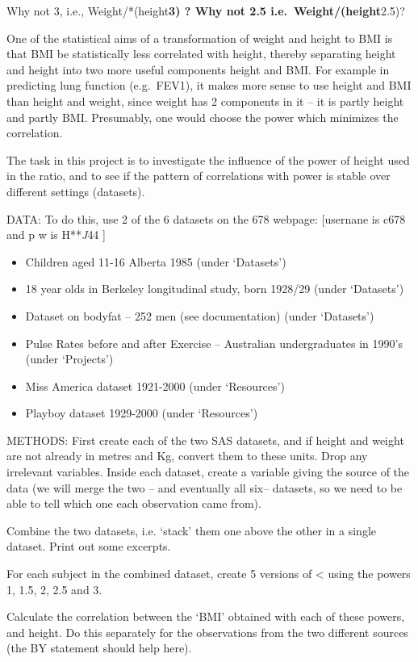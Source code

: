 \documentclass[]{book}
\providecommand{\tightlist}{%
  \setlength{\itemsep}{0pt}\setlength{\parskip}{0pt}}
\begin{document}
Why not 3, i.e., Weight/*(height\textbf{3) ? Why not 2.5 i.e.~Weight/(height}2.5)?

One of the statistical aims of a transformation of weight and height to BMI is that BMI be statistically less correlated with height, thereby separating height and height into two more useful components height and BMI. For example in predicting lung function (e.g.~FEV1), it makes more sense to use height and BMI than height and weight, since weight has 2 components in it -- it is partly height and partly BMI. Presumably, one would choose the power which minimizes the correlation.

The task in this project is to investigate the influence of the power of height used in the ratio, and to see if the pattern of correlations with power is stable over different settings (datasets).

DATA: To do this, use 2 of the 6 datasets on the 678 webpage:
{[}usernane is c678 and p w is H**\emph{J}44 {]}

\begin{itemize}
\tightlist
\item
  Children aged 11-16 Alberta 1985 (under `Datasets')
\item
  18 year olds in Berkeley longitudinal study, born 1928/29 (under `Datasets')
\item
  Dataset on bodyfat -- 252 men (see documentation) (under `Datasets')
\item
  Pulse Rates before and after Exercise -- Australian undergraduates in 1990's (under `Projects')
\item
  Miss America dataset 1921-2000 (under `Resources')
\item
  Playboy dataset 1929-2000 (under `Resources')
\end{itemize}

METHODS: First create each of the two SAS datasets, and if height and weight are not already in metres and Kg, convert them to these units. Drop any irrelevant variables. Inside each dataset, create a variable giving the source of the data (we will merge the two -- and eventually all six-- datasets, so we need to be able to tell which one each observation came from).

Combine the two datasets, i.e. `stack' them one above the other in a single dataset. Print out some excerpts.

For each subject in the combined dataset, create 5 versions of \textless{} using the powers 1, 1.5, 2, 2.5 and 3.

Calculate the correlation between the `BMI' obtained with each of these powers, and height. Do this separately for the observations from the two different sources (the BY statement should help here).
\end{document}
